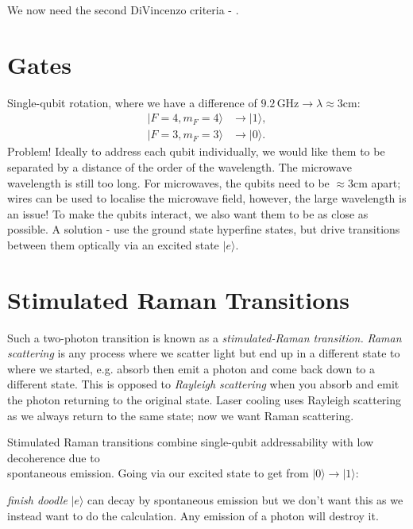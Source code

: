 \documentclass[a4paper, 11pt, normalem]{report}
\begin{document}
We now need the second DiVincenzo criteria - .

\section{Gates}
Single-qubit rotation, where we have a difference of $9.2\,$GHz$\to\lambda\approx3$cm:
\begin{align*}
    |F=4,m_F=4\rangle &\to |1\rangle, \\
    |F=3,m_F=3\rangle &\to |0\rangle.
\end{align*}
Problem!
Ideally to address each qubit individually, we would like them to be separated by a distance of the order of the wavelength.
The microwave wavelength is still too long.
For microwaves, the qubits need to be $\approx3$cm apart; wires can be used to localise the microwave field, however, the large wavelength is an issue!
To make the qubits interact, we also want them to be as close as possible.
A solution - use the ground state hyperfine states, but drive transitions between them optically via an excited state $|e\rangle$.

\section{Stimulated Raman Transitions}
Such a two-photon transition is known as a \emph{stimulated-Raman transition.}
\emph{Raman scattering} is any process where we scatter light but end up in a different state to where we started, e.g. absorb then emit a photon and come back down to a different state.
This is opposed to \emph{Rayleigh scattering} when you absorb and emit the photon returning to the original state.
Laser cooling uses Rayleigh scattering as we always return to the same state; now we want Raman scattering.

Stimulated Raman transitions combine single-qubit addressability with low decoherence due to \\spontaneous emission.
Going via our excited state to get from $|0\rangle\to|1\rangle$:
\begin{figure}[H]
    \centering
\end{figure}
\emph{finish doodle}
$|e\rangle$ can decay by spontaneous emission but we don't want this as we instead want to do the calculation.
Any emission of a photon will destroy it.
\end{document}
